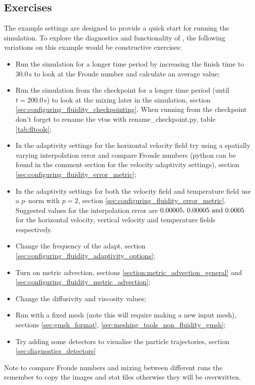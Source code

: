 \subsection{Exercises}
\label{sec:le_exercises}
The example settings are designed to provide a quick start for running the simulation. To explore the diagnostics and functionality of \fluidity, the following variations on this example would be constructive exercises:
\begin{itemize}
\item Run the simulation for a longer time period by increasing the finish time to $30.0\,$s to look at the Froude number and calculate an average value;
\item Run the simulation from the checkpoint for a longer time period (until $t=200.0\,$s) to look at the mixing later in the simulation, section \ref{sec:configuring_fluidity_checkpointing}. When running from the checkpoint don't forget to rename the vtus with rename\_checkpoint.py, table \ref{tab:fltools};
\item In the adaptivity settings for the horizontal velocity field try using a spatially varying interpolation error and compare Froude numbers (python can be found in the comment section for the velocity adaptivity settings), section \ref{sec:configuring_fluidity_error_metric};
\item In the adaptivity settings for both the velocity field and temperature field use a $p$--norm with \mbox{$p=2$}, section \ref{sec:configuring_fluidity_error_metric}. Suggested values for the interpolation error are $0.00005, \, 0.00005 \,\, {\rm and} \,\, 0.0005$ for the horizontal velocity, vertical velocity and temperature fields respectively.
\item Change the frequency of the adapt, section \ref{sec:configuring_fluidity_adaptivity_options};
\item Turn on metric advection, sections \ref{section:metric_advection_general} and \ref{sec:configuring_fluidity_metric_advection};
\item Change the diffusivity and viscosity values;
\item Run with a fixed mesh (note this will require making a new input mesh), sections \ref{sec:gmsh_format}, \ref{sec:meshing_tools_non_fluidity_gmsh};
\item Try adding some detectors to visualise the particle trajectories, section \ref{sec:diagnostics_detectors} %
\end{itemize}
Note to compare Froude numbers and mixing between different runs the remember to copy the images and stat files otherwise they will be overwritten.

